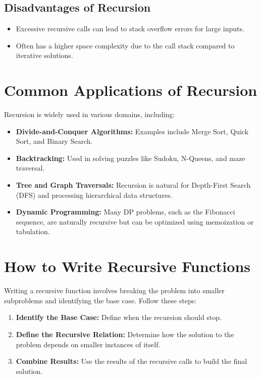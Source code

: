 \subsection*{Disadvantages of Recursion}
\begin{itemize}
    \item Excessive recursive calls can lead to stack overflow errors for large inputs.
    \item Often has a higher space complexity due to the call stack compared to iterative solutions.
\end{itemize}

\section*{Common Applications of Recursion}
Recursion is widely used in various domains, including:
\begin{itemize}
    \item \textbf{Divide-and-Conquer Algorithms:} Examples include Merge Sort, Quick Sort, and Binary Search.
    \item \textbf{Backtracking:} Used in solving puzzles like Sudoku, N-Queens, and maze traversal.
    \item \textbf{Tree and Graph Traversals:} Recursion is natural for Depth-First Search (DFS) and processing hierarchical data structures.
    \item \textbf{Dynamic Programming:} Many DP problems, such as the Fibonacci sequence, are naturally recursive but can be optimized using memoization or tabulation.
\end{itemize}

\section*{How to Write Recursive Functions}
Writing a recursive function involves breaking the problem into smaller subproblems and identifying the base case. Follow these steps:
\begin{enumerate}
    \item \textbf{Identify the Base Case:} Define when the recursion should stop.
    \item \textbf{Define the Recursive Relation:} Determine how the solution to the problem depends on smaller instances of itself.
    \item \textbf{Combine Results:} Use the results of the recursive calls to build the final solution.
\end{enumerate}

